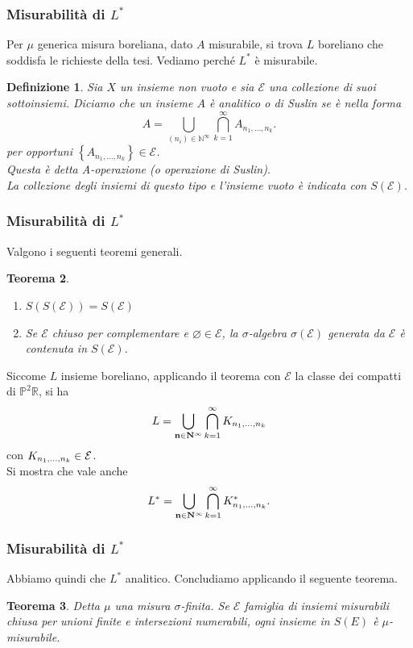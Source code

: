 \documentclass[11pt]{beamer} %
\newcommand{\R}{\mathbb{R}}
\renewcommand{\P}{\mathbb{P}}
\newcommand{\E}{\mathcal{E}}
\newcommand{\<}{\langle}
\renewcommand{\>}{\rangle}
\theoremstyle{theorem}
\newtheorem{teo}{Teorema}
\theoremstyle{theorem}
\theoremstyle{theorem}
\theoremstyle{theorem}
\newtheorem{defin}[teo]{Definizione}
\theoremstyle{theorem}
\begin{document}
\begin{frame}
	\frametitle{Misurabilità di $L^*$}
	Per $\mu$ generica misura boreliana, dato $A$ misurabile, si trova $L$ boreliano che soddisfa le richieste della tesi. Vediamo perché $L^*$ è misurabile. \pause

\begin{defin}
	Sia $X$ un insieme non vuoto e sia $\mathcal{E}$ una collezione di suoi sottoinsiemi. \pause Diciamo che un insieme $A$ è analitico o di Suslin se è nella forma
	$$
	A=\bigcup_{\left(n_{i}\right) \in \mathbb{N}^{\infty}} \bigcap_{k=1}^{\infty} A_{n_{1}, \ldots, n_{k}} .
	$$
	per opportuni $\left\{A_{n_{1}, \ldots, n_{k}}\right\} \in \E$.\\ \pause
	Questa è detta A-operazione (o operazione di Suslin).\\
	La collezione degli insiemi di questo tipo e l'insieme vuoto è indicata con $S(\mathcal{E})$.
\end{defin}	

\end{frame}

\begin{frame}[fragile]
\frametitle{Misurabilità di $L^*$}	
Valgono i seguenti teoremi generali. \pause

\begin{teo}
	\begin{enumerate}[i]
		\item $S(S(\mathcal{E}))=S(\mathcal{E})$\\ \pause
		\item Se $\E$ chiuso per complementare e $\varnothing \in \E$, la $\sigma$-algebra $\sigma(\mathcal{E})$ generata da $\mathcal{E}$ è contenuta in $S(\mathcal{E}).$
	\end{enumerate}
\end{teo}
\pause
Siccome $L$ insieme boreliano, applicando il teorema con $\E$ la classe dei compatti di $\P^2 \R$, si ha
$$L=\bigcup_{{\bf n}\in{\bf N}^\infty}\bigcap_{k=1}^\infty K_{n_1,\ldots,n_k}$$
con $K_{n_1,\ldots,n_k}\in {\cal E}$.\\ \pause
Si mostra che vale anche
$$L^*=\bigcup_{{\bf n}\in{\bf N}^\infty}\bigcap_{k=1}^\infty K_{n_1,\ldots,n_k}^*.$$

\end{frame}

\begin{frame}
\frametitle{Misurabilità di $L^*$}	
Abbiamo quindi che $L^*$ analitico. Concludiamo applicando il seguente teorema. \\
\pause
\begin{teo}
 	Detta $\mu$ una misura $\sigma$-finita. Se $\E$ famiglia di insiemi misurabili chiusa per unioni finite e intersezioni numerabili, ogni insieme in $S(E)$ è $\mu$-misurabile.
\end{teo}	
	
	
\end{frame}
\end{document}
